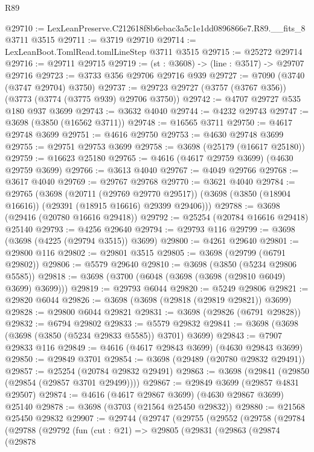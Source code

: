 \begin{lexlean}{R89}
\begin{coremodule}
@29710 := LexLeanPreserve.C212618f8b6ebac3a5c1e1dd0896866e7.R89.__fits_8 @3711 @3515
@29711 := @3719 @29710
@29714 := LexLeanBoot.TomlRead.tomlLineStep @3711 @3515
@29715 := @25272 @29714
@29716 := @29711 @29715
@29719 := (st : @3608) -> (line : @3517) -> @29707 @29716
@29723 := @3733 @356 @29706 @29716 @939
@29727 := @7090 (@3740 (@3747 @29704) @3750)
@29737 := @29723 @29727 (@3757 (@3767 @356)) (@3773 (@3774 (@3775 @939) @29706 @3750))
@29742 := @4707 @29727 @535 @180 @937 @3699
@29743 := @3632 @4040
@29744 := @4232 @29743
@29747 := @3698 (@3850 (@16562 @3711))
@29748 := @16565 @3711
@29750 := @4617 @29748 @3699
@29751 := @4616 @29750
@29753 := @4630 @29748 @3699
@29755 := @29751 @29753 @3699
@29758 := @3698 (@25179 (@16617 @25180))
@29759 := @16623 @25180
@29765 := @4616 (@4617 @29759 @3699) (@4630 @29759 @3699)
@29766 := @3613 @4040
@29767 := @4049 @29766
@29768 := @3617 @4040
@29769 := @29767 @29768
@29770 := @3621 @4040
@29784 := @29765
    (@3698
      (@20711 (@29769 @29770 @29517))
      (@3698 (@3850 (@18904 @16616)) (@29391 (@18915 @16616) @29399 @29406)))
@29788 := @3698 (@29416 (@20780 @16616 @29418))
@29792 := @25254 (@20784 @16616 @29418) @25140
@29793 := @4256 @29640
@29794 := @29793 @116
@29799 := @3698 (@3698 (@4225 (@29794 @3515)) @3699)
@29800 := @4261 @29640
@29801 := @29800 @116
@29802 := @29801 @3515
@29805 := @3698 (@29799 (@6791 @29802))
@29806 := @5579 @29640
@29810 := @3698 (@3850 (@5234 @29806 @5585))
@29818 := @3698 (@3700 (@6048 (@3698 (@3698 (@29810 @6049) @3699) @3699)))
@29819 := @29793 @6044
@29820 := @5249 @29806
@29821 := @29820 @6044
@29826 := @3698 (@3698 (@29818 (@29819 @29821)) @3699)
@29828 := @29800 @6044 @29821
@29831 := @3698 (@29826 (@6791 @29828))
@29832 := @6794 @29802
@29833 := @5579 @29832
@29841 := @3698 (@3698 (@3698 (@3850 (@5234 @29833 @5585)) @3701) @3699)
@29843 := @7907 @29833 @116
@29849 := @4616 (@4617 @29843 @3699) (@4630 @29843 @3699)
@29850 := @29849 @3701
@29854 := @3698 (@29489 (@20780 @29832 @29491))
@29857 := @25254 (@20784 @29832 @29491)
@29863 := @3698 (@29841 (@29850 (@29854 (@29857 @3701 @29499))))
@29867 := @29849 @3699 (@29857 @4831 @29507)
@29874 := @4616 (@4617 @29867 @3699) (@4630 @29867 @3699) @25140
@29878 := @3698 (@3703 (@21564 @25450 @29832))
@29880 := @21568 @25450 @29832
@29907 := @29744
    (@29747
      (@29755
        (@29552
          (@29758
            (@29784
              (@29788
                (@29792
                  (fun (cut : @21) =>
                  @29805
                    (@29831
                      (@29863
                        (@29874
                          (@29878

\end{coremodule}
\end{lexlean}
